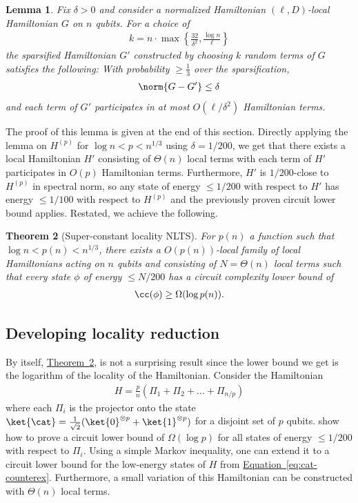 \documentclass[11pt]{article}
\newcommand{\expref}[2]{\texorpdfstring{\hyperref[#2]{#1~\ref{#2}}}{#1~\ref{#2}}}
\newcommand{\expeqref}[2]{\texorpdfstring{\hyperref[#2]{#1~\eqref{#2}}}{#1~\eqref{#2}}}
\newtheorem{theorem}{Theorem}[section]
\newtheorem{lemma}[theorem]{Lemma}
\begin{document}
\begin{lemma}
Fix $\delta > 0$ and consider a normalized Hamiltonian $(\ell, D)$-local Hamiltonian $G$ on $n$ qubits. For a choice of 
\begin{align}
    k = n \cdot \max \left\{ \frac{32}{\delta^2}, \frac{\log n}{\ell} \right\}
\end{align}
the sparsified Hamiltonian $G'$ constructed by choosing $k$ random terms of $G$ satisfies the following: With probability $\geq \frac{1}{3}$ over the sparsification,
\begin{align}
    \norm{G - G'} \leq \delta
\end{align}
and each term of $G'$ participates in at most $O(\ell/\delta^2)$ Hamiltonian terms.
\label{lem:sparsification}
\end{lemma}

The proof of this lemma is given at the end of this section. Directly applying the lemma on $H^{(p)}$ for $\log n < p < n^{1/3}$ using $\delta = 1/200$, we get that there exists a local Hamiltonian $H'$ consisting of $\Theta(n)$ local terms with each term of $H'$ participates in $O(p)$ Hamiltonian terms. Furthermore, $H'$ is $1/200$-close to $H^{(p)}$ in spectral norm, so any state of energy $\leq 1/200$ with respect to $H'$ has energy $\leq 1/100$ with respect to $H^{(p)}$ and the previously proven circuit lower bound applies. Restated, we achieve the following.

\begin{theorem}[Super-constant locality NLTS]
For $p(n)$ a function such that $\log n < p(n) < n^{1/3}$, there exists a $O(p(n))$-local family of local Hamiltonians acting on $n$ qubits and consisting of $N = \Theta(n)$ local terms such that every state $\phi$ of energy $\leq N/200$ has a circuit complexity lower bound of
\begin{align}
    \cc(\phi) \geq \Omega(\log p(n)).
\end{align}
\label{thm:amp-restate}
\end{theorem}

\subsection{Developing locality reduction}

By itself, \expref{Theorem}{thm:amp-restate}, is not a surprising result since the lower bound we get is the logarithm of the locality of the Hamiltonian. Consider the Hamiltonian
\begin{align}
    H = \frac{p}{n} \left(\Pi_1 + \Pi_2 + \ldots + \Pi_{n/p} \right) \label{eq:cat-counterex}
\end{align}
where each $\Pi_i$ is the projector onto the state $\ket{\cat} = \frac{1}{\sqrt{2}} (\ket{0}^{\otimes p} + \ket{1}^{\otimes p})$ for a disjoint set of $p$ qubits. \cite{nirkhe_et_al:LIPIcs:2018:9095} show how to prove a circuit lower bound of $\Omega(\log p)$ for all states of energy $\leq 1/200$ with respect to $\Pi_i$. Using a simple Markov inequality, one can extend it to a circuit lower bound for the low-energy states of $H$ from 
\expeqref{Equation}{eq:cat-counterex}. Furthermore, a small variation of this Hamiltonian can be constructed with $\Theta(n)$ local terms.
\end{document}
